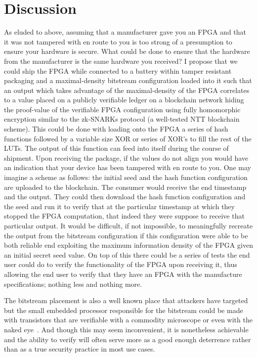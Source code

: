 \documentclass[conference]{IEEEtran}
\begin{document}
\section{Discussion}
As eluded to above, assuming that a manufacturer gave you an FPGA and that it was not tampered with en route to you is too strong of a presumption to ensure your hardware is secure. What could be done to ensure that the hardware from the manufacturer is the same hardware you received? I propose that we could ship the FPGA while connected to a battery within tamper resistant packaging and a maximal-density bitstream configuration loaded into it such that an output which takes advantage of the maximal-density of the FPGA correlates to a value placed on a publicly verifiable ledger on a blockchain network hiding the proof-value of the verifiable FPGA configuration using fully homomorphic encryption similar to the zk-SNARKs protocol (a well-tested NTT blockchain scheme). This could be done with loading onto the FPGA a series of hash functions followed by a variable size XOR or series of XOR's to fill the rest of the LUTs. The output of this function can feed into itself during the course of shipment. Upon receiving the package, if the values do not align you would have an indication that your device has been tampered with en route to you. One may imagine a scheme as follows: the initial seed and the hash function configuration are uploaded to the blockchain. The consumer would receive the end timestamp and the output. They could then download the hash function configuration and the seed and run it to verify that at the particular timestamp at which they stopped the FPGA computation, that indeed they were suppose to receive that particular output.  It would be difficult, if not impossible, to meaningfully recreate the output from the bitstream configuration if this configuration were able to be both reliable end exploiting the maximum information density of the FPGA given an initial secret seed value. On top of this there could be a series of tests the end user could do to verify the functionality of the FPGA upon receiving it, thus allowing the end user to verify that they have an FPGA with the manufacture specifications; nothing less and nothing more. 

The bitstream placement is also a well known place that attackers have targeted~\cite{swierczynski} but the small embedded processor responsible for the bitstream could be made with transistors that are verifiable with a commodity microscope or even with the naked eye~\cite{monster}. And though this may seem inconvenient, it is nonetheless achievable and the ability to verify will often serve more as a good enough deterrence rather than as a true security practice in most use cases.
\end{document}
